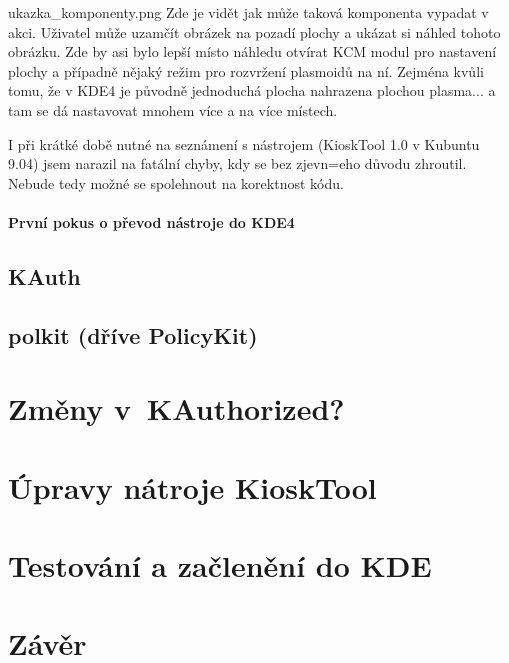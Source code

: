 ukazka_komponenty.png
Zde je vidět jak může taková komponenta vypadat v akci. Uživatel může uzamčít
obrázek na pozadí plochy a ukázat si náhled tohoto obrázku. Zde by asi bylo
lepší místo náhledu otvírat KCM modul pro nastavení plochy a případně nějaký
režim pro rozvržení plasmoidů na ní. Zejména kvůli tomu, že v KDE4 je původně
jednoduchá plocha nahrazena plochou plasma... a tam se dá nastavovat mnohem více
a na více místech.

I při krátké době nutné na seznámení s nástrojem (KioskTool 1.0 v Kubuntu 9.04)
jsem narazil na fatální chyby, kdy se bez zjevn=eho důvodu zhroutil. Nebude tedy
možné se spolehnout na korektnost kódu.
\subsubsection{První pokus o převod nástroje do KDE4}

\section{KAuth}
\section{polkit (dříve PolicyKit)}
\chapter{Změny v~KAuthorized?}
\chapter{Úpravy nátroje KioskTool}
\chapter{Testování a začlenění do KDE}
\chapter{Závěr}
\cite{fitWeb}
